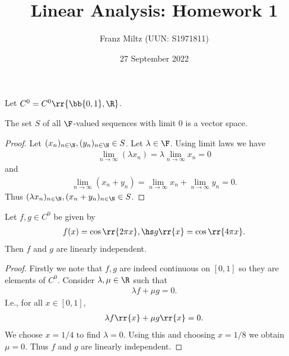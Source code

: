 \documentclass{article}
\begin{document}
\title{Linear Analysis: Homework 1}
\author{Franz Miltz (UUN: S1971811)}
\date{27 September 2022}
\maketitle

Let $C^0=C^0 \rr{ \bb{ 0,1 }, \R }$.

\begin{claim*}[2d]
	The set $S$ of all $\F$-valued sequences with limit $0$ is a vector space.
	\begin{proof}
		Let $(x_n)_{n\in\N},(y_n)_{n\in\N}\in S$. Let $\lambda\in\F$. Using limit laws we have
		\begin{align*}
			\lim_{n\to\infty}(\lambda x_n) = \lambda \lim_{n\to\infty} x_n = 0
		\end{align*}
		and
		\begin{align*}
			\lim_{n\to \infty}(x_n + y_n) = \lim_{n\to\infty} x_n + \lim_{n\to\infty} y_n = 0.
		\end{align*}
		Thus $(\lambda x_n)_{n\in\N},(x_n + y_n)_{n\in\N}\in S$.
	\end{proof}
\end{claim*}

\begin{claim*}[5]
	Let $f,g\in C^0$ be given by
	\begin{align*}
		f(x)=\cos\rr{2\pi x}, \hs g \rr{ x } = \cos \rr{ 4\pi x }.
	\end{align*}
	Then $f$ and $g$ are linearly independent.
	\begin{proof}
		Firstly we note that $f,g$ are indeed continuous on $[0,1]$ so they are elements of $C^0$.
		Consider $\lambda,\mu\in\R$ such that
		\begin{align*}
			\lambda f + \mu g = 0.
		\end{align*}
		I.e., for all $x\in[0,1]$, \begin{align*}
			\lambda f \rr{ x } + \mu g \rr{ x } = 0.
		\end{align*}
		We choose $x=1/4$ to find $\lambda = 0$. Using this and choosing $x=1/8$ we obtain $\mu=0$.
		Thus $f$ and $g$ are linearly independent.
	\end{proof}
\end{claim*}
\end{document}
